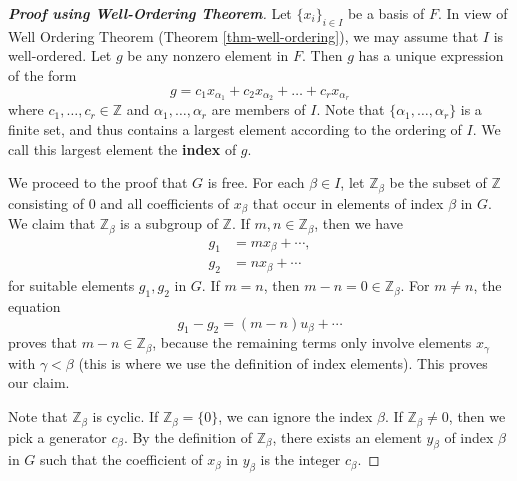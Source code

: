 \begin{proof}[\textbf{Proof using Well-Ordering Theorem}]
	Let $\{x_i\}_{i\in I}$ be a basis of $F$. In view of Well Ordering Theorem (Theorem \ref{thm-well-ordering}),  we may assume that $I$ is well-ordered. Let $g$ be any nonzero element in $F$. Then $g$ has a unique expression of the form
	\begin{equation*}
		g = c_1 x_{\alpha_1} + c_2 x_{\alpha_2} + \dots + c_r x_{\alpha_r}
	\end{equation*}
	where $c_1, \ldots, c_r\in\mathbb{Z}$  and $\alpha_1, \ldots, \alpha_r$ are members of $I$. Note that $\{\alpha_1, \ldots, \alpha_r\}$ is a finite set, and thus contains a largest element according to the ordering of $I$. We call this largest element the \textbf{index} of $g$.
	
	We proceed to the proof that $G$ is free. For each $\beta\in I$, let $\mathbb{Z}_\beta$ be the subset of $\mathbb{Z}$ consisting of $0$ and all coefficients of $x_\beta$ that occur in elements of index $\beta$ in $G$.   We claim that $\mathbb{Z}_\beta$ is a subgroup of $\mathbb{Z}$. If $m, n \in \mathbb{Z}_\beta$, then we have
	\begin{align*}
		g_1 &= m x_\beta + \cdots, 
		\\
		g_2 &= n x_\beta + \cdots
	\end{align*}
	for suitable elements $g_1, g_2$ in $G$. If $m =n$, then $m - n = 0\in \mathbb{Z}_\beta$.  For $m \ne n$, the equation
	\begin{equation*}
		g_1 - g_2 = (m - n)u_\beta + \cdots
	\end{equation*}
	proves that $m - n \in \mathbb{Z}_\beta$, because the remaining terms only involve elements $x_\gamma$ with $\gamma < \beta$ (this is where we use the definition of index elements). This proves our claim.
	
	Note that $\mathbb{Z}_\beta$ is cyclic. If $\mathbb{Z}_\beta = \{0\}$, we can ignore the index $\beta$. If $\mathbb{Z}_\beta \ne 0$, then we pick a generator $c_\beta$. By the definition of $\mathbb{Z}_\beta$, there exists an element $y_\beta$ of index $\beta$ in $G$ such that the coefficient of $x_\beta$ in $y_\beta$ is the integer $c_\beta$.  
	

\end{proof}
